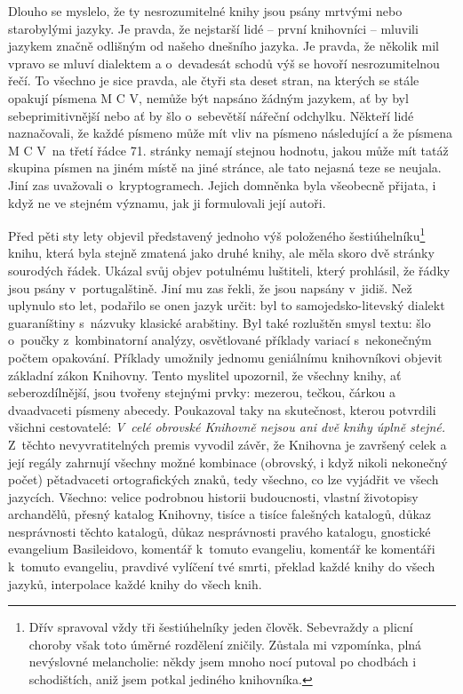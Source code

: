 \documentclass[11pt]{article}
\begin{document}
Dlouho se myslelo, že ty nesrozumitelné knihy jsou psány mrtvými nebo starobylými jazyky. Je pravda, že nejstarší lidé -- první knihovníci -- mluvili jazykem značně odlišným od našeho dnešního jazyka. Je pravda, že několik mil vpravo se mluví dialektem a o~devadesát schodů výš se hovoří nesrozumitelnou řečí. To všechno je sice pravda, ale čtyři sta deset stran, na kterých se stále opakují písmena M C V, nemůže být napsáno žádným jazykem, ať by byl sebeprimitivnější nebo ať by šlo o~sebevětší nářeční odchylku. Někteří lidé naznačovali, že každé písmeno může mít vliv na písmeno následující a že písmena M C V~na třetí řádce 71. stránky nemají stejnou hodnotu, jakou může mít tatáž skupina písmen na jiném místě na jiné stránce, ale tato nejasná teze se neujala. Jiní zas uvažovali o~kryptogramech. Jejich domněnka byla všeobecně přijata, i když ne ve stejném významu, jak ji formulovali její autoři.

Před pěti sty lety objevil představený jednoho výš položeného šestiúhelníku\footnote{Dřív spravoval vždy tři šestiúhelníky jeden člověk. Sebevraždy a plicní choroby však toto úměrné rozdělení zničily. Zůstala mi vzpomínka, plná nevýslovné melancholie: někdy jsem mnoho nocí putoval po chodbách i schodištích, aniž jsem potkal jediného knihovníka.} knihu, která byla stejně zmatená jako druhé knihy, ale měla skoro dvě stránky sourodých řádek. Ukázal svůj objev potulnému luštiteli, který prohlásil, že řádky jsou psány v~portugalštině. Jiní mu zas řekli, že jsou napsány v~jidiš. Než uplynulo sto let, podařilo se onen jazyk určit: byl to samojedsko-litevský dialekt guaraníštiny s~názvuky klasické arabštiny. Byl také rozluštěn smysl textu: šlo o~poučky z~kombinatorní analýzy, osvětlované příklady variací s~nekonečným počtem opakování. Příklady umožnily jednomu geniálnímu knihovníkovi objevit základní zákon Knihovny. Tento myslitel upozornil, že všechny knihy, ať seberozdílnější, jsou tvořeny stejnými prvky: mezerou, tečkou, čárkou a dvaadvaceti písmeny abecedy. Poukazoval taky na skutečnost, kterou potvrdili všichni cestovatelé: \textit{V~celé obrovské Knihovně nejsou ani dvě knihy úplně stejné.} Z~těchto nevyvratitelných premis vyvodil závěr, že Knihovna je završený celek a její regály zahrnují všechny možné kombinace (obrovský, i když nikoli nekonečný počet) pětadvaceti ortografických znaků, tedy všechno, co lze vyjádřit ve všech jazycích. Všechno: velice podrobnou historii budoucnosti, vlastní životopisy archandělů, přesný katalog Knihovny, tisíce a tisíce falešných katalogů, důkaz nesprávnosti těchto katalogů, důkaz nesprávnosti pravého katalogu, gnostické evangelium Basileidovo, komentář k~tomuto evangeliu, komentář ke komentáři k~tomuto evangeliu, pravdivé vylíčení tvé smrti, překlad každé knihy do všech jazyků, interpolace každé knihy do všech knih.
\end{document}
